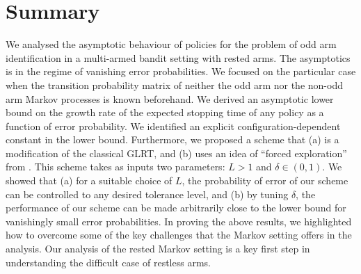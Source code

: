 \section{Summary}\label{rested_arms_sec:conclusions}
We analysed the asymptotic behaviour of policies for the problem of odd arm identification in a multi-armed bandit setting with rested arms. The asymptotics is in the regime of vanishing error probabilities. We focused on the particular case when the transition probability matrix of neither the odd arm nor the non-odd arm Markov processes is known beforehand. We derived an asymptotic lower bound on {\color{black} the growth rate of} the expected stopping time of any policy as a function of error probability. We identified an explicit configuration-dependent constant in the lower bound. Furthermore, we proposed a scheme that (a) is a modification of the classical GLRT, and (b) uses an idea of ``forced exploration'' from \cite{albert1961sequential}. This scheme takes as inputs two parameters: $L>1$ and $\delta\in(0,1)$. We showed that (a) for a suitable choice of $L$, the probability of error of our scheme can be controlled to any desired tolerance level, and (b) by tuning $\delta$, the performance of our scheme can be made arbitrarily close to the lower bound for vanishingly small error probabilities. In proving the above results, we highlighted how to overcome some of the key challenges that the Markov setting offers in the analysis. Our analysis of the rested Markov setting is a key first step in understanding the difficult case of restless arms.
